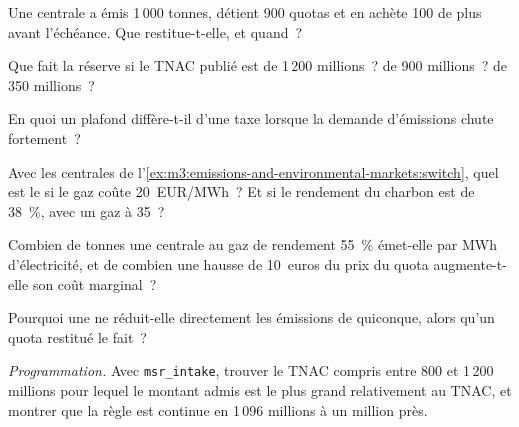 \begin{exercise}[$\star$]\label{exo:m3:emissions-and-environmental-markets:1}
Une centrale a émis 1\,000 tonnes, détient 900 quotas et en achète 100 de plus avant l'échéance. Que
restitue-t-elle, et quand~?
\end{exercise}

\begin{exercise}[$\star$]\label{exo:m3:emissions-and-environmental-markets:2}
Que fait la réserve si le TNAC publié est de 1\,200 millions~? de 900 millions~? de 350 millions~?
\end{exercise}

\begin{exercise}[$\star$]\label{exo:m3:emissions-and-environmental-markets:3}
En quoi un plafond diffère-t-il d'une taxe lorsque la demande d'émissions chute fortement~?
\end{exercise}

\begin{exercise}[$\star\star$]\label{exo:m3:emissions-and-environmental-markets:4}
Avec les centrales de l'\cref{ex:m3:emissions-and-environmental-markets:switch}, quel est le 
si le gaz coûte \qty{20}{EUR/MWh}~? Et si le rendement du charbon est de 38~\%, avec un gaz à \qty{35}{}~?
\end{exercise}

\begin{exercise}[$\star\star$]\label{exo:m3:emissions-and-environmental-markets:5}
Combien de tonnes une centrale au gaz de rendement 55~\% émet-elle par MWh d'électricité, et de combien
une hausse de 10~euros du prix du quota augmente-t-elle son coût marginal~?
\end{exercise}

\begin{exercise}[$\star\star$]\label{exo:m3:emissions-and-environmental-markets:6}
Pourquoi une  ne réduit-elle directement les émissions de quiconque, alors qu'un quota restitué le
fait~?
\end{exercise}

\begin{exercise}[$\star\star\star$]\label{exo:m3:emissions-and-environmental-markets:7}
\emph{Programmation.} Avec \texttt{msr\_intake}, trouver le TNAC compris entre 800 et 1\,200 millions pour lequel le
montant admis est le plus grand relativement au TNAC, et montrer que la règle est continue en 1\,096 millions
à un million près.
\end{exercise}

